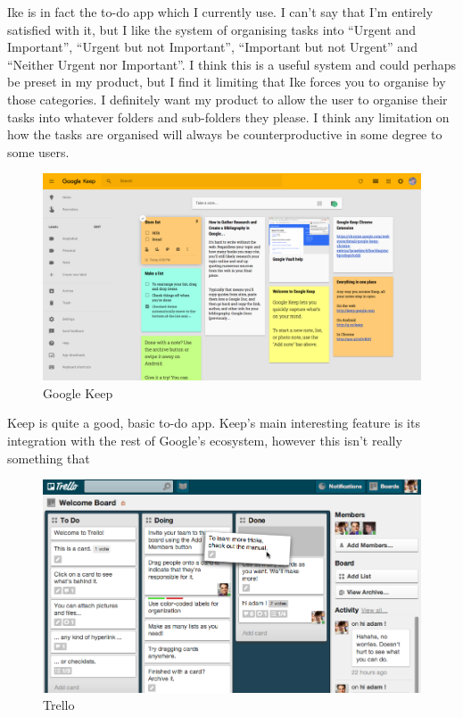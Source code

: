 \documentclass{article}
\begin{document}
Ike is in fact the to-do app which I currently use. I can't say that I'm
entirely satisfied with it, but I like the system of organising tasks into
``Urgent and Important'', ``Urgent but not Important'', ``Important but not
Urgent'' and ``Neither Urgent nor Important''. I think this is a useful system
and could perhaps be preset in my product, but I find it limiting that Ike
forces you to organise by those categories. I definitely want my product to
allow the user to organise their tasks into whatever folders and sub-folders
they please. I think any limitation on how the tasks are organised will always
be counterproductive in some degree to some users.\\

\begin{figure}[h!]
  \includegraphics[width=\linewidth]{Images/keep.png}
  \caption{Google Keep}
  \label{fig:keep1}
\end{figure}

Keep is quite a good, basic to-do app. Keep's main interesting feature is its
integration with the rest of Google's ecosystem, however this isn't really
something that 

\begin{figure}[h!]
  \includegraphics[width=\linewidth]{Images/trello.jpg}
  \caption{Trello}
  \label{fig:trello1}
\end{figure}
\end{document}
